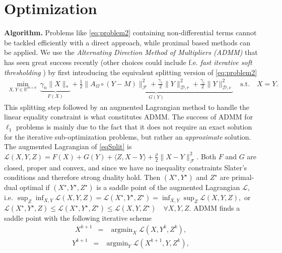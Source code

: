 \documentclass{article}
\DeclareMathOperator*{\argmin}{arg min}
\begin{document}
\section{Optimization}
\vspace{-0.15cm}
\label{secOpt}
{\bf Algorithm.} Problems like \eqref{eq:problem2} containing non-differential terms cannot be tackled efficiently with a direct approach, while proximal based methods can be applied. We use the \textit{Alternating Direction Method of Multipliers (ADMM)} that has seen great success recently \cite{boyd2011distributed} (other choices could include f.e. \textit{fast iterative soft thresholding} \cite{beck2009fast}) by first introducing the equivalent splitting version of \eqref{eq:problem2}
\vspace{-0.1cm}
\begin{eqnarray}
\min_{X,Y\in\mathbb{R}^{m\times n}}\  \underbrace{ \gamma_n \|X\|_* }_{F(X)} + \underbrace{ \frac{1}{2}\|A_\Omega \circ (Y-M)\|_\mathcal{F}^2 + \frac{\gamma_r}{2} \|Y\|^2_{\mathcal{D},r} + \frac{\gamma_c}{2} \|Y\|^2_{\mathcal{D},c} }_{G(Y)} \quad \textrm{s.t.}\quad X=Y. 
\label{eqSplit}
\end{eqnarray}
This splitting step followed by an augmented Lagrangian method to handle the linear equality constraint is what constitutes ADMM. The success of ADMM for $\ell_1$ problems is mainly due to the fact that it does not require an exact solution for the iterative sub-optimization problems, but rather an {\it approximate} solution. The augmented Lagrangian of \eqref{eqSplit} is $\mathcal{L}(X,Y,Z) = F(X) + G(Y) + \langle Z,X-Y\rangle + \frac{\rho}{2} \|X-Y\|_\mathcal{F}^2$. Both $F$ and $G$ are closed, proper and convex, and since we have no inequality constraints Slater's conditions and therefore strong duality hold. Then $(X^\star,Y^\star)$ and $Z^\star$ are primal-dual optimal if $(X^\star,Y^\star,Z^\star)$ is a saddle point of the augmented Lagrangian $\mathcal{L}$, i.e. $\sup_{Z} \inf_{X,Y} \mathcal{L}(X,Y,Z) = \mathcal{L}(X^\star,Y^\star,Z^\star) = \inf_{X,Y} \sup_{Z}  \mathcal{L}(X,Y,Z),$ or $\mathcal{L}(X^\star,Y^\star,Z) \leq \mathcal{L}(X^\star,Y^\star,Z^\star) \leq \mathcal{L}(X,Y,Z^\star)\quad \forall X,Y,Z$. ADMM finds a saddle point with the following iterative scheme
\vspace{-0.2cm}
\begin{eqnarray}
X^{k+1} &=& \argmin_X \mathcal{L}(X,Y^k,Z^k) \label{eqADMMx}, 
\end{eqnarray}
\vspace{-0.5cm}
\begin{eqnarray}
Y^{k+1} &=& \argmin_Y \mathcal{L}(X^{k+1},Y,Z^k) \label{eqADMMy}, 
\end{eqnarray}
\end{document}
